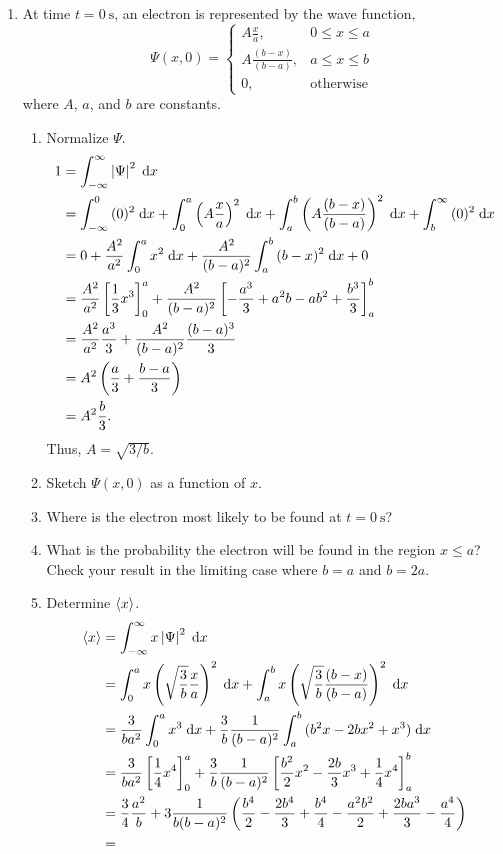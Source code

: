 \documentclass[a4paper, 12pt]{config/homework}
\begin{document}
\begin{enumerate}
\pagebreak
\item At time \(t=\qty{0}{\second}\), an electron is represented by the wave function,
\[\Psi(x, 0) = \begin{cases}
    A\frac{x}{a}, & 0 \le x \le a \\
    A \frac{(b-x)}{(b-a)}, & a \le x \le b \\
    0, & \text{otherwise}
\end{cases}\]
where \(A\), \(a\), and \(b\) are constants.
\begin{enumerate}[label=(\alph*)]
\item Normalize \(\Psi \).
\begin{align*}
1 &= \bint{-\infty}{\infty}{\left| \Psi \right|^2}{x}
\\&= \bint{-\infty}{0}{(0)^2}{x} + \bint{0}{a}{\left(A \frac{x}{a}\right)^2}{x} + \bint{a}{b}{\left(A\frac{(b-x)}{(b-a)}\right)^2}{x} + \bint{b}{\infty}{(0)^2}{x}
\\&= 0 + \frac{A^2}{a^2}\bint{0}{a}{x^2}{x} + \frac{A^2}{(b-a)^2}\bint{a}{b}{(b-x)^2}{x} + 0
\\&= \frac{A^2}{a^2} \left[\frac{1}{3}x^3\right]_0^a + \frac{A^2}{(b-a)^2}\left[-\frac{a^3}{3} + a^2b - ab^2 + \frac{b^3}{3}\right]_a^b
\\&= \frac{A^2}{a^2} \frac{a^3}{3} + \frac{A^2}{(b-a)^2}\frac{(b-a)^3}{3}
\\&= A^2 \left(\frac{a}{3} + \frac{b-a}{3}\right)
\\&= A^2 \frac{b}{3}.
\end{align*}
Thus, \(A = \sqrt{3/b}\).

\item Sketch \(\Psi(x,0)\) as a function of \(x\).

\item Where is the electron most likely to be found at \(t=\qty{0}{\second}\)?

\item What is the probability the electron will be found in the region \(x \le a\)? Check your result in the limiting case where \(b=a\) and \(b=2a\).

\item Determine \(\braket{x}\).
\begin{align*}
\braket{x} &= \bint{-\infty}{\infty}{x\left| \Psi \right|^2}{x}
\\&= \bint{0}{a}{x\left(\sqrt{\frac{3}{b}} \frac{x}{a}\right)^2}{x} + \bint{a}{b}{x\left(\sqrt{\frac{3}{b}}\frac{(b-x)}{(b-a)}\right)^2}{x}
\\&= \frac{3}{ba^2}\bint{0}{a}{x^3}{x} + \frac{3}{b}\frac{1}{(b-a)^2}\bint{a}{b}{(b^2 x - 2bx^2 + x^3)}{x}
\\&= \frac{3}{ba^2}\left[\frac{1}{4}x^4\right]_0^a + \frac{3}{b}\frac{1}{(b-a)^2} \left[\frac{b^2}{2}x^2 - \frac{2b}{3}x^3 + \frac{1}{4}x^4\right]_a^b
\\&= \frac{3}{4}\frac{a^2}{b} + 3 \frac{1}{b(b-a)^2}\left(\frac{b^4}{2} - \frac{2b^4}{3} + \frac{b^4}{4} - \frac{a^2 b^2}{2} + \frac{2ba^3}{3} - \frac{a^4}{4}\right)
\\&=
\end{align*}

\end{enumerate}
\end{enumerate}
\end{document}
